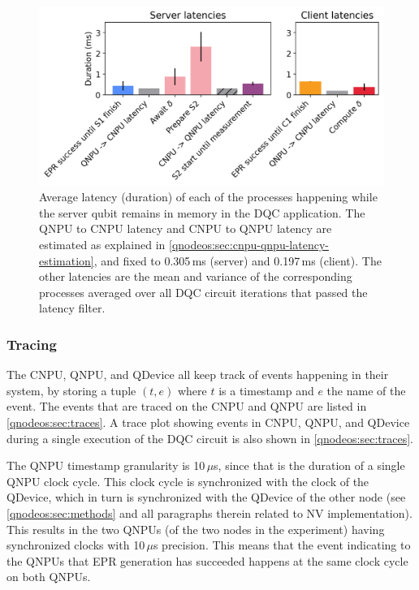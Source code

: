\begin{figure}[htbp]
\centering
\includegraphics[width=0.8\linewidth]{figures/qnodeos/supplementary/plots/latencies_variance.png}
\caption{Average latency (duration) of each of the processes happening while the server qubit remains in memory in the \ac{DQC} application. The \ac{QNPU} to \ac{CNPU} latency and \ac{CNPU} to \ac{QNPU} latency are estimated as explained in \cref{qnodeos:sec:cnpu-qnpu-latency-estimation}, and fixed to 0.305\,ms (server) and 0.197\,ms (client). The other latencies are the mean and variance of the corresponding processes averaged over all \ac{DQC} circuit iterations that passed the latency filter.}
\label{fig:delcomp-latencies-variance}
\end{figure}

\subsubsection{Tracing}

The \ac{CNPU}, \ac{QNPU}, and \ac{QDevice} all keep track of events happening in their system, by storing a tuple $(t, e)$ where $t$ is a timestamp and $e$ the name of the event. The events that are traced on the \ac{CNPU} and \ac{QNPU} are listed in \cref{qnodeos:sec:traces}. A trace plot showing events in \ac{CNPU}, \ac{QNPU}, and \ac{QDevice} during a single execution of the \ac{DQC} circuit is also shown in \cref{qnodeos:sec:traces}.

The \ac{QNPU} timestamp granularity is 10\,$\mu$s, since that is the duration of a single \ac{QNPU} clock cycle. This clock cycle is synchronized with the clock of the \ac{QDevice}, which in turn is synchronized with the \ac{QDevice} of the other node (see \cref{qnodeos:sec:methods} and all paragraphs therein related to \ac{NV} implementation). This results in the two \acp{QNPU} (of the two nodes in the experiment) having synchronized clocks with 10\,$\mu$s precision. This means that the event indicating to the \acp{QNPU} that \ac{EPR} generation has succeeded happens at the same clock cycle on both \acp{QNPU}.

